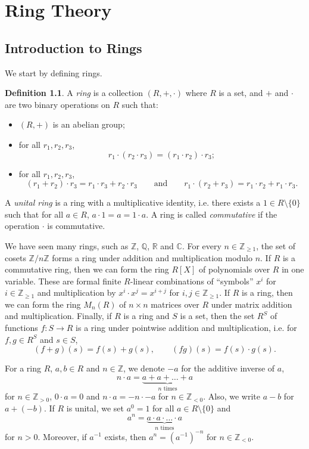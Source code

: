 \documentclass[a4paper, openany]{memoir}
\theoremstyle{definition}
\newtheorem{definition}{Definition}[section]
\theoremstyle{plain}
\begin{document}
\chapter{Ring Theory}
\section{Introduction to Rings}
We start by defining rings.
\begin{definition}
A \emph{ring} is a collection $(R, +, \cdot)$ where $R$ is a set, and $+$ and $\cdot$ are two binary operations on $R$ such that:
\begin{itemize}
    \item $(R, +)$ is an abelian group;
    \item for all $r_1, r_2, r_3$, 
    \[r_1 \cdot (r_2 \cdot r_3) = (r_1 \cdot r_2) \cdot r_3;\]
    \item for all $r_1, r_2, r_3$, 
    \[(r_1 + r_2) \cdot r_3 = r_1 \cdot r_3 + r_2 \cdot r_3 \qquad \text{and} \qquad r_1 \cdot (r_2 + r_3) = r_1 \cdot r_2 + r_1 \cdot r_3.\]
\end{itemize}
A \emph{unital ring} is a ring with a multiplicative identity, i.e. there exists a $1 \in R \setminus \{0\}$ such that for all $a \in R$, $a \cdot 1 = a = 1 \cdot a$. A ring is called \emph{commutative} if the operation $\cdot$ is commutative.
\end{definition}
\noindent We have seen many rings, such as $\mathbb{Z}$, $\mathbb{Q}$, $\mathbb{R}$ and $\mathbb{C}$. For every $n \in \mathbb{Z}_{\geqslant 1}$, the set of cosets $\mathbb{Z}/n \mathbb{Z}$ forms a ring under addition and multiplication modulo $n$. If $R$ is a commutative ring, then we can form the ring $R[X]$ of polynomials over $R$ in one variable. These are formal finite $R$-linear combinations of ``symbols'' $x^i$ for $i \in \mathbb{Z}_{\geqslant 1}$ and multiplication by $x^i \cdot x^j = x^{i+j}$ for $i, j \in \mathbb{Z}_{\geqslant 1}$. If $R$ is a ring, then we can form the ring $M_n(R)$ of $n \times n$ matrices over $R$ under matrix addition and multiplication. Finally, if $R$ is a ring and $S$ is a set, then the set $R^S$ of functions $f: S \to R$ is a ring under pointwise addition and multiplication, i.e. for $f, g \in R^S$ and $s \in S$,
\[(f + g)(s) = f(s) + g(s), \qquad (fg)(s) = f(s) \cdot g(s).\]

For a ring $R$, $a, b \in R$ and $n \in \mathbb{Z}$, we denote $-a$ for the additive inverse of $a$,
\[n \cdot a = \underbrace{a + a + \dots + a}_{n \text{ times}}\]
for $n \in \mathbb{Z}_{> 0}$, $0 \cdot a = 0$ and $n \cdot a = -n \cdot -a$ for $n \in \mathbb{Z}_{< 0}$. Also, we write $a - b$ for $a + (-b)$. If $R$ is unital, we set $a^0 = 1$ for all $a \in R \setminus \{0\}$ and
\[a^n = \underbrace{a \cdot a \cdot \dots \cdot a}_{n \text{ times}}\]
for $n > 0$. Moreover, if $a^{-1}$ exists, then $a^n = (a^{-1})^{-n}$ for $n \in \mathbb{Z}_{< 0}$.
\end{document}
